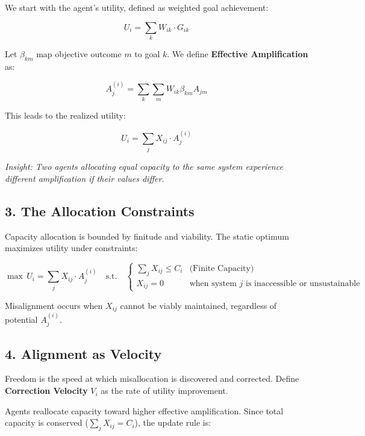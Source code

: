 \documentclass{article}
\begin{document}
We start with the agent's utility, defined as weighted goal achievement:

\begin{equation}
U_i = \sum_k W_{ik} \cdot G_{ik}
\end{equation}

Let $\beta_{km}$ map objective outcome $m$ to goal $k$. We define \textbf{Effective Amplification} as:

\begin{equation}
A_j^{(i)} = \sum_{k} \sum_{m} W_{ik} \beta_{km} A_{jm}
\end{equation}

This leads to the realized utility:

\begin{equation}
U_i = \sum_{j} X_{ij} \cdot A_j^{(i)}
\end{equation}

\textit{Insight: Two agents allocating equal capacity to the same system experience different amplification if their values differ.}

\subsection*{3. The Allocation Constraints}

Capacity allocation is bounded by finitude and viability. The static optimum maximizes utility under constraints:

\begin{equation}
\max \, U_i = \sum_{j} X_{ij} \cdot A_j^{(i)} \quad \text{s.t.} \quad 
\begin{cases} 
\sum_j X_{ij} \le C_i & \text{(Finite Capacity)} \\
X_{ij} = 0 & \text{when system $j$ is inaccessible or unsustainable}
\end{cases}
\end{equation}

Misalignment occurs when $X_{ij}$ cannot be viably maintained, regardless of potential $A_j^{(i)}$.

\subsection*{4. Alignment as Velocity}

Freedom is the speed at which misallocation is discovered and corrected. Define \textbf{Correction Velocity} $V_i$ as the rate of utility improvement.

Agents reallocate capacity toward higher effective amplification. Since total capacity is conserved ($\sum_j X_{ij} = C_i$), the update rule is:
\end{document}
